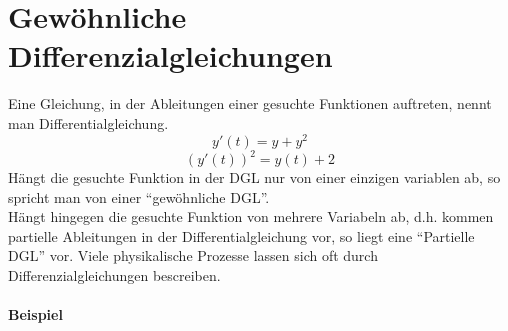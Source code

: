 \chapter{Gewöhnliche Differenzialgleichungen}
Eine Gleichung, in der Ableitungen einer gesuchte Funktionen auftreten, nennt man Differentialgleichung.
\[y'(t)=y+y^2\]
\[\left( y'(t)\right)^2=y(t)+2\]
Hängt die gesuchte Funktion in der DGL nur von einer einzigen variablen ab, so spricht man von einer ``gewöhnliche DGL''.\\

\noindent Hängt hingegen die gesuchte Funktion von mehrere Variabeln ab, d.h. kommen partielle Ableitungen in der Differentialgleichung vor, so liegt eine ``Partielle DGL'' vor. Viele physikalische Prozesse lassen sich oft durch Differenzialgleichungen bescreiben.
\subsubsection*{Beispiel}
